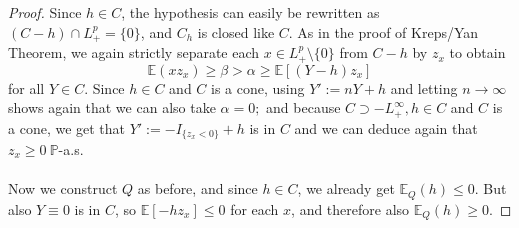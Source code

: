 \documentclass[12pt,a4paper, twoside]{article}
\theoremstyle{definition}
\newcommand{\EE}{\mathbb{E}} %
\newcommand{\PP}{\mathbb{P}} %
\begin{document}
\begin{proof}
Since $h \in C$, the hypothesis can easily be rewritten as $(C-h) \cap L_+^p = \{0\}$, and $C_h$ is closed like $C$. As in the proof of Kreps/Yan Theorem, we again strictly separate each $x \in L_+^p \setminus \{0\}$ from $C-h$ by $z_x$ to obtain $$\EE(xz_x) \geq \beta > \alpha \geq \EE[(Y-h)z_x]$$ for all $Y \in C$. Since $h \in C$ and $C$ is a cone, using $Y':= nY +h$ and letting $n \to \infty$ shows again that we can also take $\alpha = 0;$ and because $C \supset -L_+^\infty, h \in C$ and $C$ is a cone, we get that $Y':= -I_{\{z_x<0\}} +h$ is in $C$ and we can deduce again that $z_x \geq 0 \ \PP$-a.s.\\
\\
 Now we construct $Q$ as before, and since $h \in C$, we already get $\EE_Q(h) \leq 0$. But also $Y \equiv 0$ is in $C$, so $\EE[-hz_x] \leq 0$ for each $x$, and therefore also $\EE_Q(h) \geq 0$. 
\end{proof}
\newpage
\end{document}

